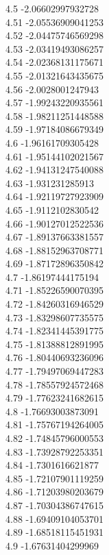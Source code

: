 {4.5	-2.06602997932728\\
4.51	-2.05536909041253\\
4.52	-2.04475746569298\\
4.53	-2.03419493086257\\
4.54	-2.02368131175671\\
4.55	-2.01321643435675\\
4.56	-2.0028001247943\\
4.57	-1.99243220935561\\
4.58	-1.98211251448588\\
4.59	-1.97184086679349\\
4.6	-1.96161709305428\\
4.61	-1.95144102021567\\
4.62	-1.94131247540088\\
4.63	-1.931231285913\\
4.64	-1.92119727923909\\
4.65	-1.9112102830542\\
4.66	-1.90127012522536\\
4.67	-1.89137663381557\\
4.68	-1.88152963708771\\
4.69	-1.87172896350842\\
4.7	-1.86197444175194\\
4.71	-1.85226590070395\\
4.72	-1.84260316946529\\
4.73	-1.83298607735575\\
4.74	-1.82341445391775\\
4.75	-1.81388812891995\\
4.76	-1.80440693236096\\
4.77	-1.79497069447283\\
4.78	-1.78557924572468\\
4.79	-1.77623241682615\\
4.8	-1.76693003873091\\
4.81	-1.75767194264005\\
4.82	-1.74845796000553\\
4.83	-1.73928792253351\\
4.84	-1.7301616621877\\
4.85	-1.72107901119259\\
4.86	-1.71203980203679\\
4.87	-1.70304386747615\\
4.88	-1.69409104053701\\
4.89	-1.68518115451931\\
4.9	-1.67631404299969\\
}

